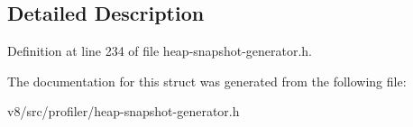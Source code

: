 \subsection{Detailed Description}


Definition at line 234 of file heap-\/snapshot-\/generator.\+h.



The documentation for this struct was generated from the following file\+:\begin{DoxyCompactItemize}
\item 
v8/src/profiler/heap-\/snapshot-\/generator.\+h\end{DoxyCompactItemize}
